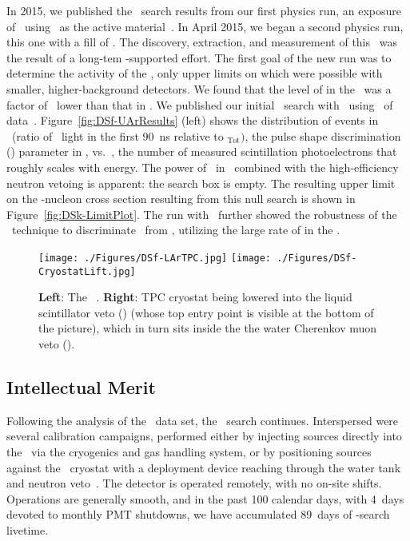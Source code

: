 In 2015, we published the \WIMP\ search results from our first physics run, an exposure of \DSfAArLiveDay\ using  \AAr\ as the active material~\cite{Agnes:2015gu}.  In April 2015, we began a second physics run, this one with a fill of \UAr.    The discovery, extraction, and measurement of this \UAr\ was the result of a long-tem \NSF-supported effort.  The first goal of the new run was to determine the activity of the \UAr, only upper limits on which were possible with smaller, higher-background detectors.  We found that the level of  in the \UAr\ was a factor of \DSfAAronUArratio\ lower than that in \AAr.  We published our initial \WIMP\ search with \UAr\ using \DSfUArLiveDay\ of data~\cite{Agnes:2016fz}.  Figure~\ref{fig:DSf-UArResults} (left) shows the distribution of events in \FNine\ (ratio of \SOne\ light in the first \SI{90}{\nano\second} relative to \SOne$_{\text{Tot}})$, the pulse shape discrimination (\PSD) parameter in \LAr, vs.~\SOne, the number of measured scintillation photoelectrons that roughly scales with energy.  The power of \PSD\ in \LAr\ combined with the high-efficiency neutron vetoing is apparent: the search box is empty. The resulting upper limit on the \WIMP-nucleon cross section resulting from this null search is shown in Figure~\ref{fig:DSk-LimitPlot}.  The run with \AAr\ further showed the robustness of the \PSD\ technique to discriminate \NRs\ from \ERs, utilizing the large rate of  in the \AAr.

\begin{figure}[!tb]
\begin{center}
\texttt{[image: ./Figures/DSf-LArTPC.jpg]}
\hspace{0.1in}
\texttt{[image: ./Figures/DSf-CryostatLift.jpg]}
\end{center}
\caption{{\bf Left}: The \DSfs\ \LArTPC.  {\bf Right}: TPC cryostat being lowered into the liquid scintillator veto (\LSV) (whose top entry point is visible at the bottom of the picture), which in turn sits inside the the water Cherenkov muon veto (\WCV).}
\label{fig:DSf-Pictures} 
\end{figure}


\subsection{Intellectual Merit}
\label{sec:PreviousResults-IntellectualMerit}

Following the analysis of the \DSfUArLiveDay\ data set, the \WIMP\ search continues.  Interspersed were several calibration campaigns, performed either by injecting sources directly into the \LAr\ via the cryogenics and gas handling system, or by positioning sources against the \LArTPC\ cryostat with a deployment device reaching through the water tank and neutron veto~\cite{Agnes:2016ur}.  The detector is operated remotely, with no on-site shifts.  Operations are generally smooth, and in the past \num{100} calendar days, with \num{4}~days devoted to monthly PMT shutdowns, we have accumulated \num{89}~days of \WIMP-search livetime.

